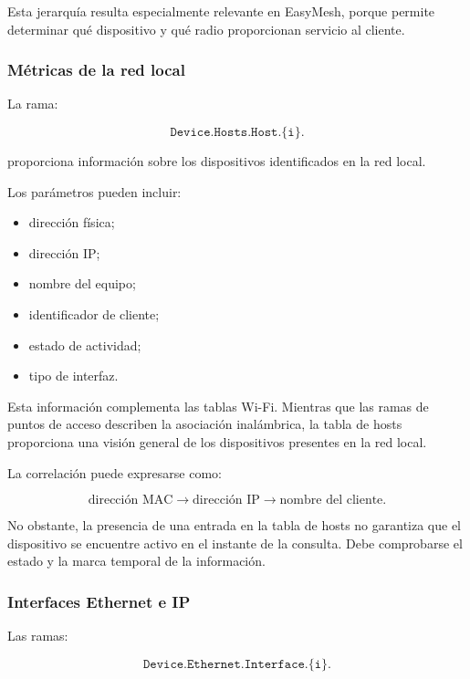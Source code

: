 Esta jerarquía resulta especialmente relevante en EasyMesh, porque
permite determinar qué dispositivo y qué radio proporcionan servicio al
cliente.


\subsubsection*{Métricas de la red local}

La rama:

\[
    \texttt{Device.Hosts.Host.\{i\}.}
\]

proporciona información sobre los dispositivos identificados en la red
local.

Los parámetros pueden incluir:

\begin{itemize}
    \item dirección física;

    \item dirección IP;

    \item nombre del equipo;

    \item identificador de cliente;

    \item estado de actividad;

    \item tipo de interfaz.
\end{itemize}

Esta información complementa las tablas Wi-Fi. Mientras que las ramas de
puntos de acceso describen la asociación inalámbrica, la tabla de hosts
proporciona una visión general de los dispositivos presentes en la red
local.

La correlación puede expresarse como:

\[
    \text{dirección MAC}
    \longrightarrow
    \text{dirección IP}
    \longrightarrow
    \text{nombre del cliente}.
\]

No obstante, la presencia de una entrada en la tabla de hosts no
garantiza que el dispositivo se encuentre activo en el instante de la
consulta. Debe comprobarse el estado y la marca temporal de la
información.


\subsubsection*{Interfaces Ethernet e IP}

Las ramas:

\[
    \texttt{Device.Ethernet.Interface.\{i\}.}
\]

